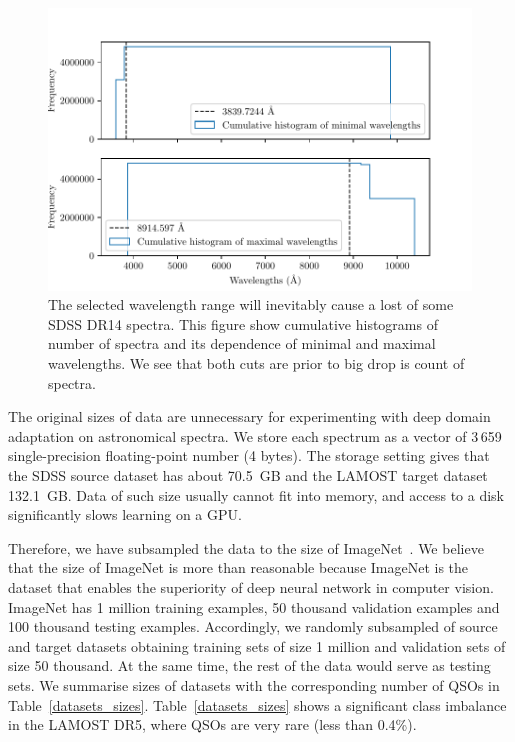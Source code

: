 \begin{figure}
\includegraphics[width=\textwidth]{img/waves_cumulative_hist.pdf}
\caption[Losts in SDSS DR14 spectra due to wavelength range]{
	The selected wavelength range will inevitably
	cause a lost of some SDSS DR14 spectra.
	This figure show cumulative histograms of number of spectra
	and its dependence of minimal and maximal wavelengths.
	We see that both cuts are prior to big drop is count of spectra.
	}
\label{waves_cumulative_hist}
\end{figure}

The original sizes of data are unnecessary for experimenting with deep domain adaptation on astronomical spectra.
We store each spectrum as a vector of 3\,659 single-precision floating-point number (4 bytes).
The storage setting gives that the SDSS source dataset has about 70.5~GB
and the LAMOST target dataset 132.1~GB.
Data of such size usually cannot fit into memory,
and access to a disk significantly slows learning on a GPU.

Therefore, we have subsampled the data to the size of ImageNet~\cite{russakovsky2015}.
We believe that the size of ImageNet is more than reasonable
because ImageNet is the dataset that enables the superiority of deep neural network in computer vision.
ImageNet has 1 million training examples, 50 thousand validation examples
and 100 thousand testing examples.
Accordingly, we randomly subsampled of source and target datasets
obtaining training sets of size 1 million
and validation sets of size 50 thousand.
At the same time, the rest of the data would serve as testing sets.
We summarise sizes of datasets with the corresponding number of QSOs in Table~\ref{datasets_sizes}.
Table~\ref{datasets_sizes} shows a significant class imbalance in the LAMOST DR5,
where QSOs are very rare (less than 0.4\%).

